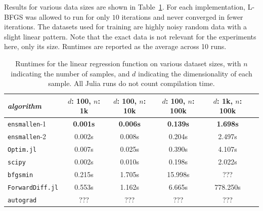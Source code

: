 \documentclass{article}
\begin{document}


Results for various data sizes are shown in Table~\ref{tab:lbfgs}.  For each
implementation, L-BFGS was allowed to run for only $10$ iterations and never
converged in fewer iterations.  The datasets used for training are highly noisy random
data with a slight linear pattern. Note that the exact data is not relevant
for the experiments here, only its size.  Runtimes are reported as the
average across 10 runs.

\begin{table}
\centering
\begin{adjustbox}{scale={0.90}{0.90}}
\begin{tabular}{lccccc}
\toprule
{\em algorithm} & $d$: 100, $n$: 1k & $d$: 100, $n$: 10k & $d$: 100, $n$:
100k & $d$: 1k, $n$: 100k \\
\midrule
{\tt ensmallen}-1 & {\bf 0.001s} & {\bf 0.006s} & {\bf 0.139s} & {\bf 1.698s} \\
{\tt ensmallen}-2 & 0.002s & 0.008s & 0.204s & 2.497s \\
{\tt Optim.jl} & 0.007s & 0.025s & 0.390s & 4.107s \\
{\tt scipy} & 0.002s & 0.010s & 0.198s & 2.022s \\
{\tt bfgsmin} & 0.215s & 1.705s & 15.998s & ??? \\
{\tt ForwardDiff.jl} & 0.553s & 1.162s & 6.665s & 778.250s \\
{\tt autograd} & ??? & ??? & ??? & ??? \\
\bottomrule
\end{tabular}
\end{adjustbox}
\vspace*{0.25ex}
\caption{\footnotesize
Runtimes for the linear regression function on various dataset sizes,
with $n$ indicating the number of samples,
and $d$ indicating the dimensionality of each sample.
All Julia runs do not count compilation time.}
\label{tab:lbfgs}
\end{table}
\end{document}

